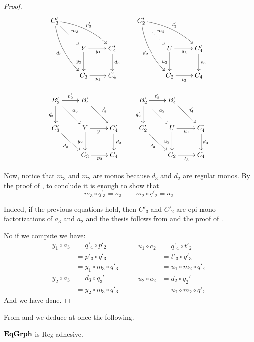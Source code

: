 \begin{proof}
\[\xymatrix{C'_3 \ar@{.>}[dr]^{m_3} \ar@/^.3cm/[drr]^{p'_3} \ar@/_.3cm/[ddr]_{d_3} &&& C'_2 \ar@{.>}[dr]^{m_2} \ar@/^.3cm/[drr]^{t'_3} \ar@/_.3cm/[ddr]_{d_2}\\&Y \ar[r]_{y_1} \ar[d]_{y_2}& C'_4\ar[d]^{d_3}&& U \ar[d]_{u_2}\ar[r]_{u_1}& C'_4 \ar[d]^{d_3}\\&C_3 \ar[r]_{p_3}& C_4 &&C_2 \ar[r]_{t_3}& C_4 }\]

\[\xymatrix{B'_3 \ar@{.>}[dr]^{a_3} \ar[r]^{p'_2} \ar[d]_{q'_3} &B'_4\ar[dr]^{q'_4}&& B'_2\ar@{.>}[dr]^{a_2} \ar[r]^{t'_2} \ar[d]_{q'_2} &B'_4\ar[dr]^{q'_4}\\C'_3 \ar[dr]_{d_3} &Y \ar[r]_{y_1} \ar[d]_{y_2}& C'_4\ar[d]^{d_3}&C_2' \ar[dr]_{d_2}& U \ar[d]_{u_2}\ar[r]_{u_1}& C'_4 \ar[d]^{d_3}\\&C_3 \ar[r]_{p_3}& C_4 &&C_2 \ar[r]_{t_3}& C_4 }\]

Now, notice that  $m_3$ and $m_2$ are monos because $d_3$ and $d_2$ are regular monos. By the proof of , to conclude it is enough to show that
\[m_3\circ q'_3 = a_3 \qquad m_2\circ q'_2=a_2\]

Indeed, if the previous equations hold, then $C'_3$ and $C'_2$ are epi-mono factorizations of $a_3$ and $a_2$ and the thesis follows from  and the proof of .

No if we compute we have:
\[\begin{split}
	y_1\circ a_3&= q'_4\circ p'_2\\&=p'_3 \circ q'_3\\&=y_1\circ m_3\circ q'_3  
\end{split}\qquad \begin{split}
	u_1\circ a_2&= q'_4\circ t'_2\\&=t'_3 \circ q'_3\\&=u_1\circ m_2\circ q'_2  
\end{split}\]
\[\begin{split}
y_2\circ a_3&= d_3\circ q_3'\\&=y_2\circ m_3\circ q'_3
\end{split}\qquad \begin{split}
u_2\circ a_2&= d_2\circ q_2'\\&=u_2\circ m_2\circ q'_2
\end{split}\]
And we have done.
\end{proof} 

From  and  we deduce at once the following.

\begin{cor}\label{cor:equi}
	$\mathbf{EqGrph}$ is Reg-adhesive.
\end{cor}

\color{black}
